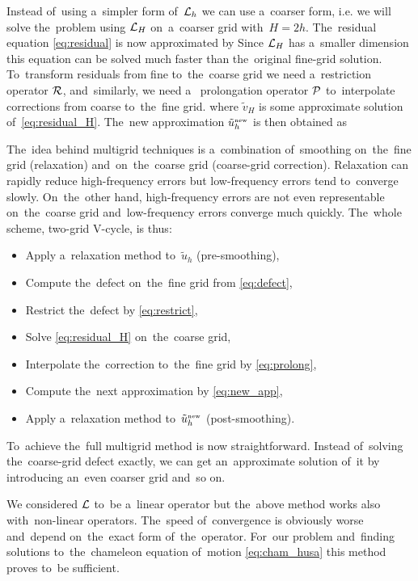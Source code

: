 Instead of~using a~simpler form of~$\mathcal{L}_h$ we can use a~coarser form, i.e. we will solve the~problem using $\mathcal{L}_H$ on~a~coarser grid with~$H=2h$. The~residual equation \eqref{eq:residual} is now approximated by
Since $\mathcal{L}_H$ has a~smaller dimension this equation can be solved much faster than the~original fine-grid solution. To~transform residuals from fine to~the~coarse grid we need a~restriction operator $\mathcal{R}$, and~similarly, we need a~ prolongation operator $\mathcal{P}$ to~interpolate corrections from coarse to~the~fine grid.
where $\tilde v_H$ is some approximate solution of~\eqref{eq:residual_H}. The~new approximation $\tilde u_h^\text{\tiny new}$ is then obtained as

The~idea behind multigrid techniques is a~combination of~smoothing on~the~fine grid (relaxation) and~on~the~coarse grid (coarse-grid correction). Relaxation can rapidly reduce high-frequency errors but low-frequency errors tend to~converge slowly. On~the~other hand, high-frequency errors are not even representable on~the~coarse grid and~low-frequency errors converge much quickly. The~whole scheme, two-grid V-cycle, is thus:
\begin{itemize}
    \item Apply a~relaxation method to~$\tilde u_h$ (pre-smoothing),
    \item Compute the~defect on~the~fine grid from \eqref{eq:defect},
    \item Restrict the~defect by \eqref{eq:restrict},
    \item Solve \eqref{eq:residual_H} on~the~coarse grid,
    \item Interpolate the~correction to~the~fine grid by \eqref{eq:prolong},
    \item Compute the~next approximation by \eqref{eq:new_app},
    \item Apply a~relaxation method to~$\tilde u_h^\text{\tiny new}$ (post-smoothing).
\end{itemize}
To~achieve the~full multigrid method is now straightforward. Instead of~solving the~coarse-grid defect exactly, we can get an~approximate solution of~it by introducing an~even coarser grid and~so on.

We considered $\mathcal{L}$ to~be a~linear operator but the~above method works also with~non-linear operators. The~speed of~convergence is obviously worse and~depend on~the~exact form of~the~operator. For~our problem and~finding solutions to~the~chameleon equation of~motion \eqref{eq:cham_husa} this method proves to~be sufficient.

